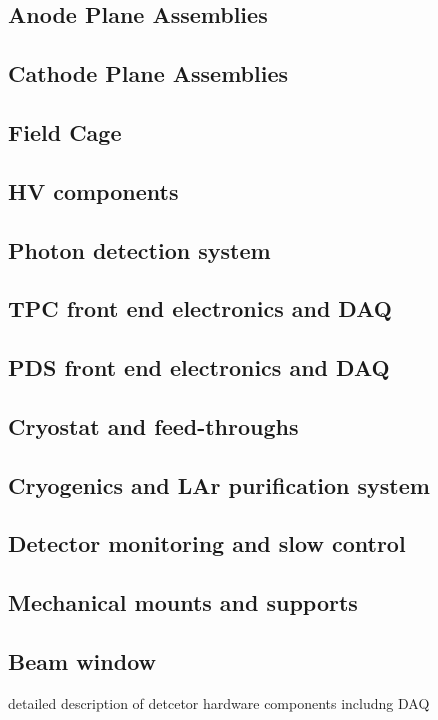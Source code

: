 
\subsection{Anode Plane Assemblies}

\subsection{Cathode Plane Assemblies}

\subsection{Field Cage}

\subsection{HV components}

\subsection{Photon detection system}

\subsection{TPC front end electronics and DAQ}

\subsection{PDS front end electronics and DAQ}

\subsection{Cryostat and feed-throughs}

\subsection{Cryogenics and LAr purification system}

\subsection{Detector monitoring and slow control}

\subsection{Mechanical mounts and supports}

\subsection{Beam window}

detailed description of detcetor hardware components includng DAQ

